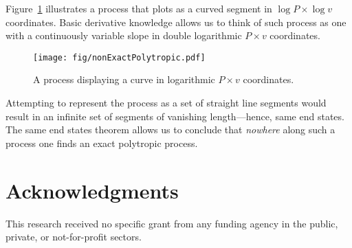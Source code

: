 \documentclass[10pt,a4paper]{article}
\begin{document}
\begin{multicols*}{2}
    Figure~\ref{fig:non.exact} illustrates a process that plots as a curved segment in  $\log  P
    \times \log v$ coordinates. Basic derivative knowledge allows us to think of such process as
    one with a continuously variable slope in double logarithmic $P\times v$ coordinates.

    \begin{figure}[H] %
        \centering
        \label{fig:non.exact}
        \texttt{[image: fig/nonExactPolytropic.pdf]}
        \caption{A process displaying a curve in logarithmic $P\times v$ coordinates.}
    \end{figure}

    Attempting to represent the process as a set of straight line segments would  result  in  an
    infinite set of segments of vanishing length---hence, same end states. The same  end  states
    theorem allows us to conclude that \emph{nowhere} along such a process one  finds  an  exact
    polytropic process.

\section*{Acknowledgments}

    This research received no specific grant from any funding agency in the public, private,  or
    not-for-profit sectors.





\end{multicols*}

\end{document}
